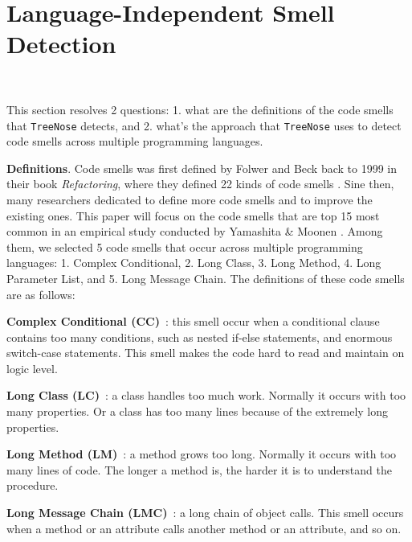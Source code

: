 


\vspace*{-0.5em}

\section{Language-Independent Smell Detection}~\label{sec:approach}

\vspace*{-0.1em}

This section resolves 2 questions: 1. what are the definitions of the code
smells that \texttt{TreeNose} detects, and 2. what's the approach that
\texttt{TreeNose} uses to detect code smells across multiple programming
languages.


{\bf Definitions}. Code smells was first defined by Folwer and Beck back to 1999
in their book \textit{Refactoring}, where they defined 22 kinds of code smells
\cite{Fowler_Beck}. Sine then, many researchers dedicated to define more code
smells and to improve the existing ones. This paper will focus on the code
smells that are top 15 most common in an empirical study conducted by Yamashita
\& Moonen \cite{developersCare}. Among them, we selected 5 code smells that
occur across multiple programming languages: 1. Complex Conditional, 2. Long
Class, 3. Long Method, 4. Long Parameter List, and 5. Long Message Chain. The
definitions of these code smells are as follows:

\textbf{Complex Conditional (CC)}~\cite{Fowler_Beck}: this smell occur when a
conditional clause contains too many conditions, such as nested if-else
statements, and enormous switch-case statements. This smell makes the code hard
to read and maintain on logic level.

\textbf{Long Class (LC)}~\cite{Fowler_Beck}: a class handles too much work.
Normally it occurs with too many properties. Or a class has too many lines
because of the extremely long properties.

\textbf{Long Method (LM)}~\cite{Fowler_Beck}: a method grows too long. Normally
it occurs with too many lines of code. The longer a method is, the harder it is
to understand the procedure.

\textbf{Long Message Chain (LMC)}~\cite{Fowler_Beck}: a long chain of object
calls. This smell occurs when a method or an attribute calls another method or
an attribute, and so on.

